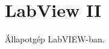 \documentclass[../../main.tex]{subfiles}
\begin{document}
\section{LabView II}

\begin{fulltheorem}
	Állapotgép LabVIEW-ban.
\end{fulltheorem}
\end{document}
